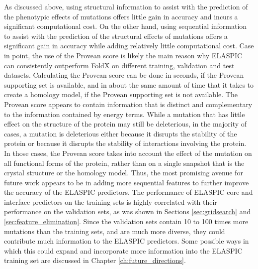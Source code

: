 As discussed above, using structural information to assist with the prediction of the phenotypic effects of mutations offers little gain in accuracy and incurs a significant computational cost. On the other hand, using sequential information to assist with the prediction of the structural effects of mutations offers a significant gain in accuracy while adding relatively little computational cost. Case in point, the use of the Provean score is likely the main reason why ELASPIC can consistently outperform FoldX on different training, validation and test datasets. Calculating the Provean score can be done in seconds, if the Provean supporting set is available, and in about the same amount of time that it takes to create a homology model, if the Provean supporting set is not available. The Provean score appears to contain information that is distinct and complementary to the information contained by energy terms. While a mutation that has little effect on the structure of the protein may still be deleterious, in the majority of cases, a mutation is deleterious either because it disrupts the stability of the protein or because it disrupts the stability of interactions involving the protein. In those cases, the Provean score takes into account the effect of the mutation on all functional forms of the protein, rather than on a single snapshot that is the crystal structure or the homology model. Thus, the most promising avenue for future work appears to be in adding more sequential features to further improve the accuracy of the ELASPIC predictors. The performance of ELASPIC core and interface predictors on the training sets is highly correlated with their performance on the validation sets, as was shown in Sections \ref{sec:gridsearch} and \ref{sec:feature_elimination}. Since the validation sets contain 10 to 100 times more mutations than the training sets, and are much more diverse, they could contribute much information to the ELASPIC predictors. Some possible ways in which this could expand and incorporate more information into the ELASPIC training set are discussed in Chapter \ref{ch:future_directions}.
